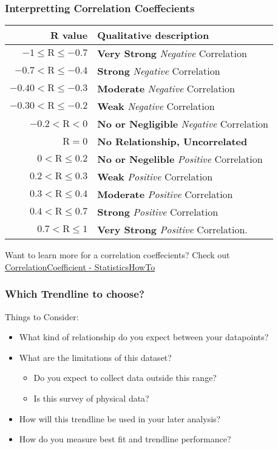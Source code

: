\documentclass[12pt]{beamer}
\begin{document}
\begin{frame}
	\frametitle{Interpretting Correlation Coeffecients}
	\begin{center}
		\begin{tabular}{r | l }
			R value & Qualitative description\\
			\hline
			$-1 \leq \text{R}\leq-0.7$ & \textbf{Very Strong} \textit{Negative} Correlation \\
			$-0.7<\text{R} \leq -0.4 $& \textbf{Strong} \textit{Negative} Correlation \\
			$-0.40 < \text{R} \leq -0.3$ & \textbf{Moderate} \textit{Negative} Correlation \\
			$-0.30 < \text{R} \leq -0.2 $ & \textbf{Weak} \textit{Negative} Correlation \\
			$-0.2 < \text{R} < 0$ & \textbf{No or Negligible} \textit{Negative} Correlation\\
			$\text{R}=0$ & \textbf{No Relationship, Uncorrelated }\\
			$0<\text{R} \leq 0.2 $& \textbf{No or Negelible} \textit{Positive} Correlation \\
			$0.2 < \text{R} \leq 0.3 $ &\textbf{Weak} \textit{Positive} Correlation \\
			$0.3 < \text{R} \leq 0.4$ &  \textbf{Moderate} \textit{Positive} Correlation \\
			$0.4 < \text{R} \leq 0.7$ & \textbf{Strong} \textit{Positive} Correlation\\
			$0.7< \text{R} \leq 1$ &\textbf{ Very Strong} \textit{Positive} Correlation.
		\end{tabular}
	\end{center}
	\bigskip
	Want to learn more for a correlation coeffecients? Check out
	\textcolor{blue}{
	\href{https://www.statisticshowto.com/probability-and-statistics/correlation-coefficient-formula/}{CorrelationCoefficient - StatisticsHowTo}}
\end{frame}
	\begin{frame}
		\frametitle{Which Trendline to choose?}
	Things to Consider:
	\begin{itemize}
		\item What kind of relationship do you expect between your datapoints?
		\item What are the limitations of this dataset?
			\begin{itemize}
				\item Do you expect to collect data outside this range?
				\item Is this survey of physical data?
			\end{itemize}
		\item How will this trendline be used in your later analysis?
		\item How do you measure best fit and trendline performance?	
\end{itemize}
	\end{frame}
\end{document}
